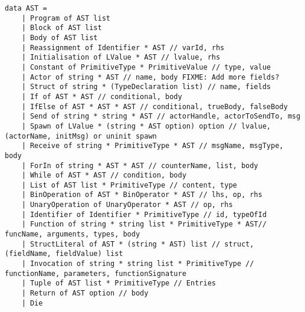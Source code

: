 \begin{lstlisting}[style = fsharp, label = lst:ast_listing, caption = {Data type of AST used throughout the compiler}]
data AST = 
    | Program of AST list
    | Block of AST list
    | Body of AST list
    | Reassignment of Identifier * AST // varId, rhs
    | Initialisation of LValue * AST // lvalue, rhs
    | Constant of PrimitiveType * PrimitiveValue // type, value
    | Actor of string * AST // name, body FIXME: Add more fields?
    | Struct of string * (TypeDeclaration list) // name, fields
    | If of AST * AST // conditional, body
    | IfElse of AST * AST * AST // conditional, trueBody, falseBody
    | Send of string * string * AST // actorHandle, actorToSendTo, msg
    | Spawn of LValue * (string * AST option) option // lvalue, (actorName, initMsg) or uninit spawn
    | Receive of string * PrimitiveType * AST // msgName, msgType, body
    | ForIn of string * AST * AST // counterName, list, body
    | While of AST * AST // condition, body
    | List of AST list * PrimitiveType // content, type
    | BinOperation of AST * BinOperator * AST // lhs, op, rhs
    | UnaryOperation of UnaryOperator * AST // op, rhs
    | Identifier of Identifier * PrimitiveType // id, typeOfId
    | Function of string * string list * PrimitiveType * AST// funcName, arguments, types, body
    | StructLiteral of AST * (string * AST) list // struct, (fieldName, fieldValue) list
    | Invocation of string * string list * PrimitiveType // functionName, parameters, functionSignature
    | Tuple of AST list * PrimitiveType // Entries
    | Return of AST option // body
    | Die
\end{lstlisting}
